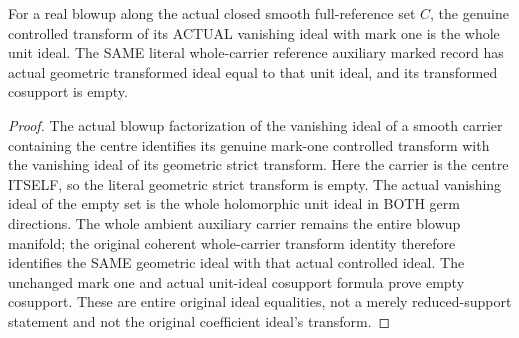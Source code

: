 \begin{lemma}
\label{hir:original-full-reference-whole-auxiliary-unit-transform}
\leanok
{}
For a real blowup along the actual closed smooth full-reference set $C$,
the genuine controlled transform of its ACTUAL vanishing ideal with mark
one is the whole unit ideal. The SAME literal whole-carrier reference
auxiliary marked record has actual geometric transformed ideal equal to
that unit ideal, and its transformed cosupport is empty.
\end{lemma}
\begin{proof}
The actual blowup factorization of the vanishing ideal of a smooth carrier
containing the centre identifies its genuine mark-one controlled transform
with the vanishing ideal of its geometric strict transform. Here the carrier
is the centre ITSELF, so the literal geometric strict transform is empty.
The actual vanishing ideal of the empty set is the whole holomorphic unit
ideal in BOTH germ directions. The whole ambient auxiliary carrier remains
the entire blowup manifold; the original coherent whole-carrier transform
identity therefore identifies the SAME geometric ideal with that actual
controlled ideal. The unchanged mark one and actual unit-ideal cosupport
formula prove empty cosupport. These are entire original ideal equalities,
not a merely reduced-support statement and not the original coefficient
ideal's transform.
\end{proof}

